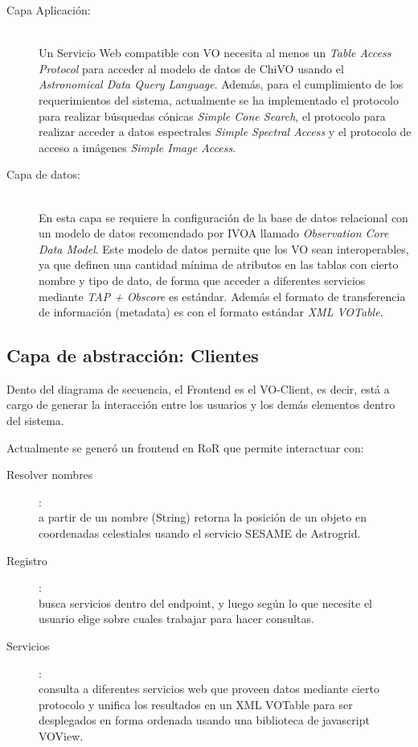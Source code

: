 \begin{description}
    \item[Capa Aplicación:] \hfill \\
        Un Servicio Web compatible con VO necesita al menos un \emph{Table Access
        Protocol} para acceder al modelo de datos de ChiVO usando el
        \emph{Astronomical Data Query Language}.
        Además, para el cumplimiento de los requerimientos del sistema,
        actualmente se ha implementado
        el protocolo para realizar búsquedas cónicas \emph{Simple Cone Search}, el protocolo para realizar acceder a datos
        espectrales \emph{Simple Spectral Access} y el protocolo de
        acceso a imágenes \emph{Simple Image Access}.

    \item[Capa de datos:] \hfill \\
        En esta capa se requiere la configuración de la base de datos relacional con
        un modelo de datos recomendado por IVOA llamado \emph{Observation Core Data
        Model}. Este modelo de datos permite que los VO sean interoperables,
        ya que definen una cantidad mínima de atributos en las tablas con cierto
        nombre y tipo de dato, de forma que acceder a diferentes servicios mediante
        \emph{TAP + Obscore} es estándar.
        Además el formato de transferencia de información (metadata) es con el
        formato estándar \emph{XML VOTable}.
\end{description}

\subsection{Capa de abstracción: Clientes}

Dento del diagrama de secuencia, el Frontend es el VO-Client, es decir, está a cargo
de generar la interacción entre los usuarios y los demás elementos dentro del
sistema.

Actualmente se generó un frontend en RoR que permite interactuar con:

\begin{description}
    \item[Resolver nombres]:\hfill \\
        a partir de un nombre (String) retorna la posición de un objeto en
        coordenadas celestiales usando el servicio SESAME de Astrogrid.
    \item[Registro]: \hfill \\
        busca servicios dentro del endpoint, y luego según lo que necesite el
        usuario elige sobre cuales trabajar para hacer consultas.
    \item[Servicios]: \hfill \\
        consulta a diferentes servicios web que proveen datos mediante cierto
        protocolo y unifica los resultados en un XML VOTable para ser desplegados
        en forma ordenada usando una biblioteca de javascript VOView.
\end{description}

